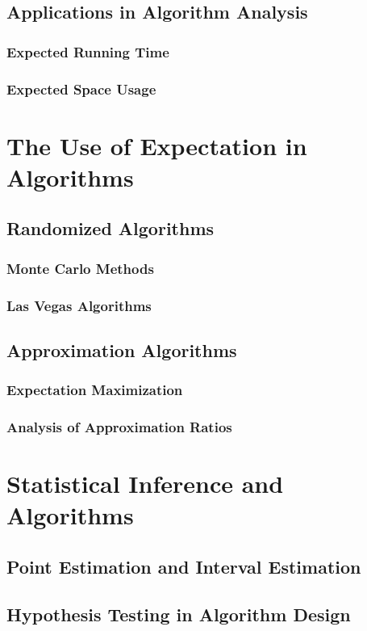 \documentclass[12pt]{book} %
\begin{document}
\subsection{Applications in Algorithm Analysis}
\subsubsection{Expected Running Time}
\subsubsection{Expected Space Usage}

\section{The Use of Expectation in Algorithms}
\subsection{Randomized Algorithms}
\subsubsection{Monte Carlo Methods}
\subsubsection{Las Vegas Algorithms}
\subsection{Approximation Algorithms}
\subsubsection{Expectation Maximization}
\subsubsection{Analysis of Approximation Ratios}

\section{Statistical Inference and Algorithms}
\subsection{Point Estimation and Interval Estimation}
\subsection{Hypothesis Testing in Algorithm Design}
\end{document}
